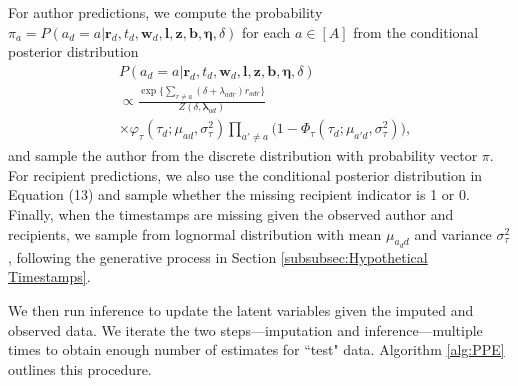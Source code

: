 \documentclass{article}
\begin{document}
 	   For author predictions, we compute the probability $\pi_a = P(a_d=a|\boldsymbol{r}_d, t_d, \boldsymbol{w}_d, \boldsymbol{l}, \boldsymbol{z}, \boldsymbol{b}, \boldsymbol{\eta},\delta)$ for each $a \in [A]$ from the conditional posterior distribution
 	   \begin{equation}
 	   \begin{aligned}
 	   &P(a_d = a|\boldsymbol{r}_d, t_d, \boldsymbol{w}_d, \boldsymbol{l}, \boldsymbol{z}, \boldsymbol{b}, \boldsymbol{\eta},\delta) \\&\propto \frac{\exp\Big\{\sum\limits_{r \neq a} (\delta+\lambda_{adr})r_{adr}\Big\}}{Z(\delta,\boldsymbol{\lambda}_{ad})}\\&\times\varphi_{\tau}(\tau_{d}; \mu_{ad}, \sigma_\tau^2) \prod
 	   \limits_{a'\neq a}\big(1-\Phi_{\tau}(\tau_{d}; \mu_{a' d}, \sigma_\tau^2) \big),
 	   \end{aligned}
 	   \end{equation}
 	   and sample the author from the discrete distribution with probability vector $\pi$. For recipient predictions, we also use the conditional posterior distribution in Equation (13) and sample whether the missing recipient indicator is 1 or 0. Finally, when the timestamps are missing given the observed author and recipients, we sample from lognormal distribution with mean $\mu_{a_dd}$ and variance $\sigma^2_\tau$, following the generative process in Section \ref{subsubsec:Hypothetical Timestamps}. 
 	   
 	   We then run inference to update the latent variables given the imputed and observed data. We iterate the two steps---imputation and inference---multiple times to obtain enough number of estimates for ``test" data. Algorithm \ref{alg:PPE} outlines this procedure.
 	   
\end{document}
